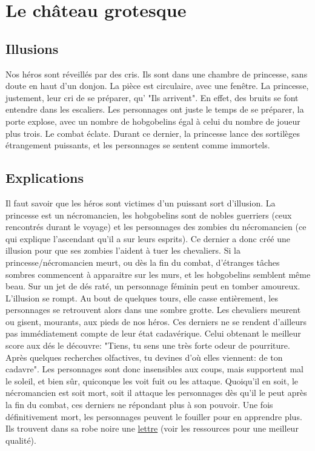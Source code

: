 \documentclass[a4paper, 11pt]{article}
\begin{document}
\section{Le château grotesque}
\subsection{Illusions}
Nos héros sont réveillés par des cris. Ils sont dans une chambre de princesse, sans doute en haut d'un donjon. La pièce est circulaire, avec une fenêtre. La princesse, justement, leur cri de se préparer, qu' "Ils arrivent". En effet, des bruits se font entendre dans les escaliers. Les personnages ont juste le temps de se préparer, la porte explose, avec un nombre de hobgobelins égal à celui du nombre de joueur plus trois. Le combat éclate. Durant ce dernier, la princesse lance des sortilèges étrangement puissants, et les personnages se sentent comme immortels.

\subsection{Explications} 
Il faut savoir que les héros sont victimes d'un puissant sort d'illusion. La princesse est un nécromancien, les hobgobelins sont de nobles guerriers (ceux rencontrés durant le voyage) et les personnages des zombies du nécromancien (ce qui explique l'ascendant qu'il a sur leurs esprits). Ce dernier a donc créé une illusion pour que ses zombies l'aident à tuer les chevaliers. Si la princesse/nécromancien meurt, ou dès la fin du combat, d'étranges tâches sombres commencent à apparaitre sur les murs, et les hobgobelins semblent même beau. Sur un jet de dés raté, un personnage féminin peut en tomber amoureux. L'illusion se rompt. Au bout de quelques tours, elle casse entièrement, les personnages se retrouvent alors dans une sombre grotte.
\newline
Les chevaliers meurent ou gisent, mourants, aux pieds de nos héros. Ces derniers ne se rendent d’ailleurs pas immédiatement compte de leur état  cadavérique. Celui obtenant le meilleur score aux dés le découvre: "Tiens, tu sens une très forte odeur de pourriture. Après quelques recherches olfactives, tu devines d'où elles viennent: de ton cadavre". Les personnages sont donc insensibles aux coups, mais supportent mal le soleil, et bien sûr, quiconque les voit fuit ou les attaque.
\newline
Quoiqu'il en soit, le nécromancien est soit mort, soit il attaque les personnages dès qu'il le peut après la fin du combat, ces derniers ne répondant plus à son pouvoir. Une fois définitivement mort, les personnages peuvent le fouiller pour en apprendre plus. Ils trouvent dans sa robe noire une \hyperlink{lettre}{lettre} (voir les ressources pour une meilleur qualité).
\end{document}
